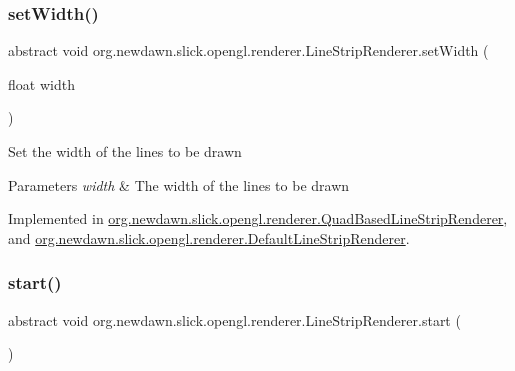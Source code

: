 \subsubsection{\texorpdfstring{set\+Width()}{setWidth()}}
{\footnotesize\ttfamily abstract void org.\+newdawn.\+slick.\+opengl.\+renderer.\+Line\+Strip\+Renderer.\+set\+Width (\begin{DoxyParamCaption}\item[{float}]{width }\end{DoxyParamCaption})\hspace{0.3cm}{\ttfamily [abstract]}}

Set the width of the lines to be drawn


\begin{DoxyParams}{Parameters}
{\em width} & The width of the lines to be drawn \\
\hline
\end{DoxyParams}


Implemented in \mbox{\hyperlink{classorg_1_1newdawn_1_1slick_1_1opengl_1_1renderer_1_1_quad_based_line_strip_renderer_a1ebfc1a913b6cb8763137ba710354689}{org.\+newdawn.\+slick.\+opengl.\+renderer.\+Quad\+Based\+Line\+Strip\+Renderer}}, and \mbox{\hyperlink{classorg_1_1newdawn_1_1slick_1_1opengl_1_1renderer_1_1_default_line_strip_renderer_a0e31016a63b0166c556eb10309fd4603}{org.\+newdawn.\+slick.\+opengl.\+renderer.\+Default\+Line\+Strip\+Renderer}}.

\mbox{\label{interfaceorg_1_1newdawn_1_1slick_1_1opengl_1_1renderer_1_1_line_strip_renderer_ac677ca9ed9c30f39a3eeb72b0532229a}} 
\subsubsection{\texorpdfstring{start()}{start()}}
{\footnotesize\ttfamily abstract void org.\+newdawn.\+slick.\+opengl.\+renderer.\+Line\+Strip\+Renderer.\+start (\begin{DoxyParamCaption}{ }\end{DoxyParamCaption})\hspace{0.3cm}{\ttfamily [abstract]}}


